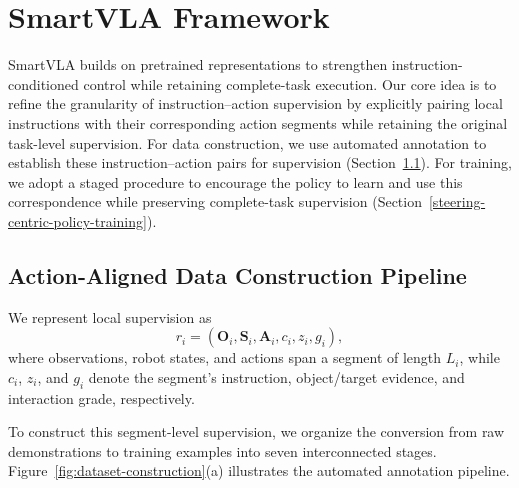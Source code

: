 %

\hypertarget{method}{%
\section{SmartVLA Framework}\label{method}}

SmartVLA builds on pretrained representations to strengthen instruction-conditioned control while
retaining complete-task execution. Our core idea is to refine the granularity of instruction--action
supervision by explicitly pairing local instructions with their corresponding action segments while
retaining the original task-level supervision. For data construction, we use automated annotation to
establish these instruction--action pairs for supervision
(Section~\ref{steering-oriented-data-construction}). For training, we adopt a staged procedure to
encourage the policy to learn and use this correspondence while preserving complete-task supervision
(Section~\ref{steering-centric-policy-training}).

\hypertarget{steering-oriented-data-construction}{%
\subsection{Action-Aligned Data Construction Pipeline}\label{steering-oriented-data-construction}}

We represent local supervision as
\[
r_i=(\mathbf O_i,\mathbf S_i,\mathbf A_i,c_i,z_i,g_i),
\]
where observations, robot states, and actions span a segment of length $L_i$, while $c_i$, $z_i$,
and $g_i$ denote the segment's instruction, object/target evidence, and interaction grade,
respectively.

To construct this segment-level supervision, we organize the conversion from raw demonstrations to
training examples into seven interconnected stages. Figure~\ref{fig:dataset-construction}(a)
illustrates the automated annotation pipeline.

